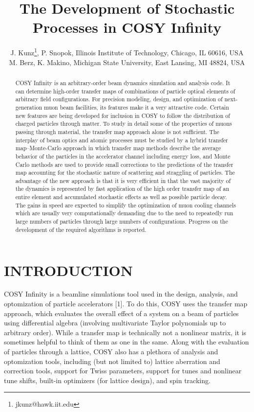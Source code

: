 \documentclass{jacow}
\begin{document}
\title{The Development of Stochastic Processes in COSY Infinity}

\author{J. Kunz\thanks{jkunz@hawk.iit.edu}, P. Snopok, Illinois Institute of Technology, Chicago, IL 60616, USA\\
        M. Berz, K. Makino, Michigan State University, East Lansing, MI 48824, USA}

\maketitle

\begin{abstract}
COSY Infinity is an arbitrary-order beam dynamics simulation and analysis code. It can determine high-order transfer maps of combinations of particle optical elements of arbitrary field configurations. For precision modeling, design, and optimization of next-generation muon beam facilities, its features make it a very attractive code. Certain new features are being developed for inclusion in COSY to follow the distribution of charged particles through matter. To study in detail some of the properties of muons passing through material, the transfer map approach alone is not sufficient. The interplay of beam optics and atomic processes must be studied by a hybrid transfer map--Monte-Carlo approach in which transfer map methods describe the average behavior of the particles in the accelerator channel including energy loss, and Monte Carlo methods are used to provide small corrections to the predictions of the transfer map accounting for the stochastic nature of scattering and straggling of particles. The advantage of the new approach is that it is very efficient in that the vast majority of the dynamics is represented by fast application of the high order transfer map of an entire element and accumulated stochastic effects as well as possible particle decay. The gains in speed are expected to simplify the optimization of muon cooling channels which are usually very computationally demanding due to the need to repeatedly run large numbers of particles through large numbers of configurations. Progress on the development of the required algorithms is reported.
\end{abstract}

\section{INTRODUCTION}
COSY Infinity is a beamline simulations tool used in the design, analysis, and optomization of particle accelerators [1]. To do this, COSY uses the transfer map approach, which evaluates the overall effect of a system on a beam of particles  using differential algebra (involving multivariate Taylor polynomials up to arbitrary order). While a transfer map is technically not a nonlinear matrix, it is sometimes helpful to think of them as one in the same. Along with the evaluation of particles through a lattice, COSY also has a plethora of analysis and optomization tools, including (but not limited to) lattice aberration and correction tools, support for Twiss parameters, support for tunes and nonlinear tune shifts, built-in optimizers (for lattice design), and spin tracking. \par
\end{document}
